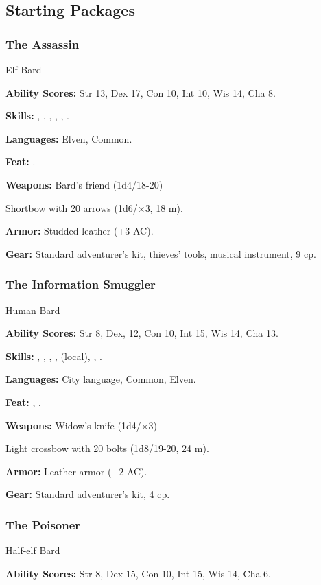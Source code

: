 \subsection{Starting Packages}
\subsubsection{The Assassin}
Elf Bard

\textbf{Ability Scores:} Str 13, Dex 17, Con 10, Int 10, Wis 14, Cha 8.

\textbf{Skills:} , , , , , .

\textbf{Languages:} Elven, Common.

\textbf{Feat:} .

\textbf{Weapons:} Bard's friend (1d4/18-20)

Shortbow with 20 arrows (1d6/$\times$3, 18 m).

\textbf{Armor:} Studded leather (+3 AC).

\textbf{Gear:} Standard adventurer's kit, thieves' tools, musical instrument, 9 cp.

\subsubsection{The Information Smuggler}
Human Bard

\textbf{Ability Scores:} Str 8, Dex, 12, Con 10, Int 15, Wis 14, Cha 13.

\textbf{Skills:} , , , ,  (local), , .

\textbf{Languages:} City language, Common, Elven.

\textbf{Feat:} , .

\textbf{Weapons:} Widow's knife (1d4/$\times$3)

Light crossbow with 20 bolts (1d8/19-20, 24 m).

\textbf{Armor:} Leather armor (+2 AC).

\textbf{Gear:} Standard adventurer's kit, 4 cp.

\subsubsection{The Poisoner}
Half-elf Bard

\textbf{Ability Scores:} Str 8, Dex 15, Con 10, Int 15, Wis 14, Cha 6.

